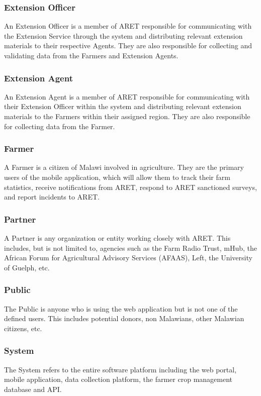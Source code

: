 \documentclass[12pt,letterpaper]{article}
\begin{document}
\subsubsection*{Extension Officer}
An Extension Officer is a member of ARET responsible for communicating with the Extension Service through the system and distributing relevant extension materials to their respective Agents. They are also responsible for collecting and validating data from the Farmers and Extension Agents.

\subsubsection*{Extension Agent}
An Extension Agent is a member of ARET responsible for communicating with their Extension Officer within the system and distributing relevant extension materials to the Farmers within their assigned region. They are also responsible for collecting data from the Farmer.

\subsubsection*{Farmer}
A Farmer is a citizen of Malawi involved in agriculture. They are the primary users of the mobile application, which will allow them to track their farm statistics, receive notifications from ARET, respond to ARET sanctioned surveys, and report incidents to ARET.

\subsubsection*{Partner}
A Partner is any organization or entity working closely with ARET. This includes, but is not limited to, agencies such as the Farm Radio Trust, mHub, the African Forum for Agricultural Advisory Services (AFAAS), Left, the University of Guelph, etc.

\subsubsection*{Public}
The Public is anyone who is using the web application but is not one of the defined users. This includes potential donors, non Malawians, other Malawian citizens, etc.

\subsubsection*{System}
The System refers to the entire software platform including the web portal, mobile application, data collection platform, the farmer crop management database and API.
\end{document}
